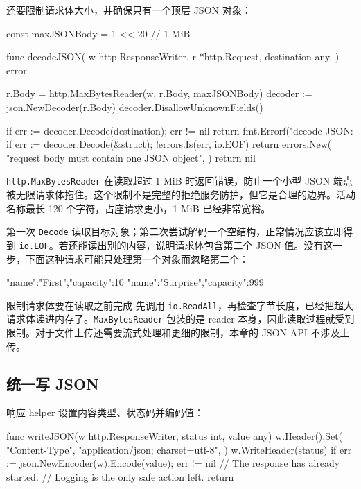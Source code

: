 还要限制请求体大小，并确保只有一个顶层 JSON 对象：

\begin{gocode}[title={代码清单 12.26 \texttt{json.go}：安全、严格地解码请求体}]
const maxJSONBody = 1 << 20 // 1 MiB

func decodeJSON(
    w http.ResponseWriter,
    r *http.Request,
    destination any,
) error {
    r.Body = http.MaxBytesReader(w, r.Body, maxJSONBody)
    decoder := json.NewDecoder(r.Body)
    decoder.DisallowUnknownFields()

    if err := decoder.Decode(destination); err != nil {
        return fmt.Errorf("decode JSON: %
    }
    if err := decoder.Decode(&struct{}{}); !errors.Is(err, io.EOF) {
        return errors.New(
            "request body must contain one JSON object",
        )
    }
    return nil
}
\end{gocode}

\texttt{http.MaxBytesReader} 在读取超过 1 MiB 时返回错误，防止一个小型 JSON 端点被无限请求体拖住。这个限制不是完整的拒绝服务防护，但它是合理的边界。活动名称最长 120 个字符，占座请求更小，1 MiB 已经非常宽裕。

第一次 \texttt{Decode} 读取目标对象；第二次尝试解码一个空结构，正常情况应该立即得到 \texttt{io.EOF}。若还能读出别的内容，说明请求体包含第二个 JSON 值。没有这一步，下面这种请求可能只处理第一个对象而忽略第二个：

\begin{jsoncode}[]
{"name":"First","capacity":10}
{"name":"Surprise","capacity":999}
\end{jsoncode}

\begin{warningbox}{限制请求体要在读取之前完成}
先调用 \texttt{io.ReadAll}，再检查字节长度，已经把超大请求体读进内存了。\texttt{MaxBytesReader} 包装的是 reader 本身，因此读取过程就受到限制。对于文件上传还需要流式处理和更细的限制，本章的 JSON API 不涉及上传。
\end{warningbox}

\subsection{统一写 JSON}

响应 helper 设置内容类型、状态码并编码值：

\begin{gocode}[title={代码清单 12.27 \texttt{json.go}：写入 JSON 响应}]
func writeJSON(w http.ResponseWriter, status int, value any) {
    w.Header().Set(
        "Content-Type",
        "application/json; charset=utf-8",
    )
    w.WriteHeader(status)
    if err := json.NewEncoder(w).Encode(value); err != nil {
        // The response has already started.
        // Logging is the only safe action left.
        return
    }
}
\end{gocode}

